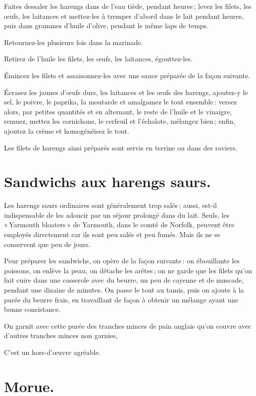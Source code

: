 Faites dessaler les harengs dans de l'eau tiède, pendant {\mmm} heures ;
levez les filets, les œufs, les laitances et mettez-les à tremper d'abord dans
le lait pendant {\mmm} heures, puis dans {\mmm} grammes d'huile
d'olive, pendant le même laps de temps.

Retournez-les plusieurs fois dans la marinade.

Retirez de l'huile les filets, les œufs, les laitances, égouttez-les.

Émincez les filets et assaisonnez-les avec une sauce préparée de la façon
suivante.

Écrasez les jaunes d'œufs durs, les laitances et les œufs des harengs,
ajoutez-y le sel, le poivre, le paprika, la moutarde et amalgamez le tout
ensemble : versez alors, par petites quantités et en alternant, le reste de
l'huile et le vinaigre, remuez, mettez les cornichons, le cerfeuil et
l'échalote, mélangez bien ; enfin, ajoutez la crème et homogénéisez le tout.

Les filets de harengs ainsi préparés sont servis en terrine ou dans des raviers.

\section*{\centering Sandwichs aux harengs saurs.}

Les harengs saurs ordinaires sont généralement trop salés ; aussi, est-il
indispensable de les adoucir par un séjour prolongé dans du lait. Seuls, les
« Yarmouth bloaters » de Yarmouth, dans le comté de Norfolk, peuvent être
employés directement car ils sont peu salés et peu fumés. Mais ils ne se
conservent que peu de jours.

Pour préparer les sandwichs, on opère de la façon suivante : on ébouillante les
poissons, on enlève la peau, on détache les arêtes ; on ne garde que les filets
qu'on fait cuire dans une casserole avec du beurre, un peu de cayenne et de
muscade, pendant une dizaine de minutes. On passe le tout au tamis, puis on
ajoute à la purée du beurre frais, en travaillant de façon à obtenir un mélange
ayant une bonne consistance.

On garnit avec cette purée des tranches minces de pain anglais qu'on couvre
avec d'autres tranches minces non garnies,

C'est un hors-d'œuvre agréable.

\section*{\centering Morue.}

